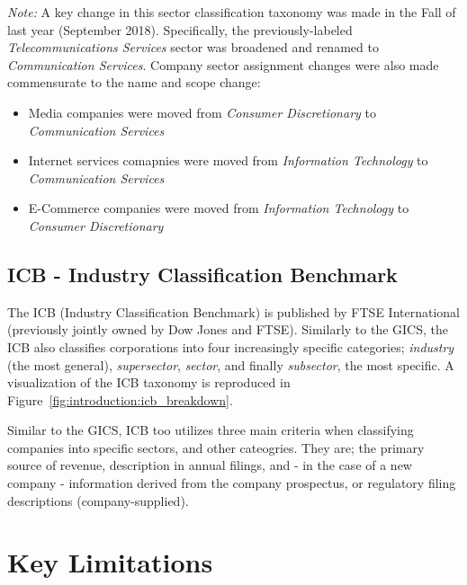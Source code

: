 \documentclass[../main.tex]{subfiles}
\begin{document}
\textit{Note:} A key change in this sector classification taxonomy was made in the Fall of last year (September 2018). Specifically, the previously-labeled \textit{Telecommunications Services} sector was broadened and renamed to \textit{Communication Services}. Company sector assignment changes were also made commensurate to the name and scope change:

\begin{itemize}
    \item Media companies were moved from \textit{Consumer Discretionary} to \textit{Communication Services}
    \item Internet services comapnies were moved from \textit{Information Technology} to \textit{Communication Services}
    \item E-Commerce companies were moved from \textit{Information Technology} to \textit{Consumer Discretionary}
\end{itemize}

\subsection{ICB - Industry Classification Benchmark}

The ICB (Industry Classification Benchmark) is published by FTSE International (previously jointly owned by Dow Jones and FTSE). Similarly to the GICS, the ICB also classifies corporations into four increasingly specific categories; \textit{industry} (the most general), \textit{supersector}, \textit{sector}, and finally \textit{subsector}, the most specific. A visualization of the ICB taxonomy is reproduced in Figure~\ref{fig:introduction:icb_breakdown}.


Similar to the GICS, ICB too utilizes three main criteria when classifying companies into specific sectors, and other cateogries. They are; the primary source of revenue, description in annual filings, and - in the case of a new company - information derived from the company prospectus, or regulatory filing descriptions (company-supplied).


\section{Key Limitations}
\end{document}

